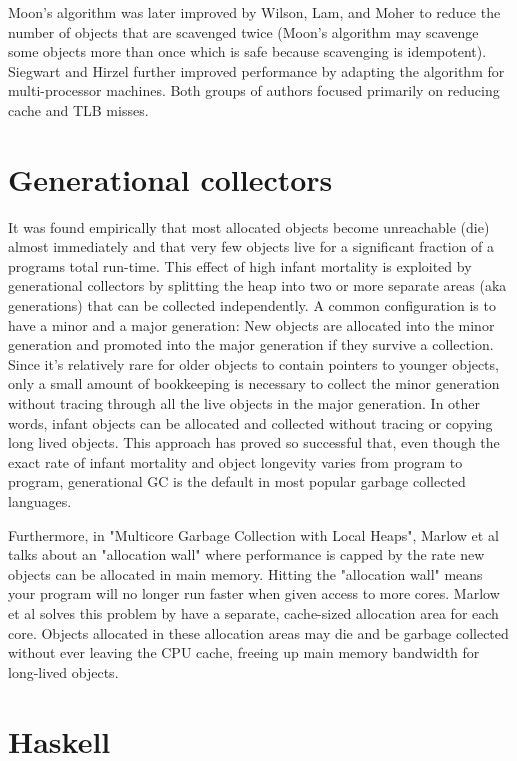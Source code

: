 \documentclass[a4paper,oneside]{memoir}
\begin{document}
Moon's algorithm was later improved by Wilson, Lam, and Moher to reduce the
number of objects that are scavenged twice (Moon's algorithm may scavenge
some objects more than once which is safe because scavenging is idempotent).
\cite{Lam:1992}
Siegwart and Hirzel further improved performance by adapting the algorithm for
multi-processor machines.\cite{Siegwart:2006} Both groups of authors focused primarily on reducing
cache and TLB misses.

\section{Generational collectors}

It was found empirically that most allocated objects become unreachable (die)
almost immediately and that very few objects live for a significant fraction
of a programs total run-time.\cite{Courts:1988,Appel:1989} This effect of high infant mortality is exploited
by generational collectors by splitting the heap into two or more separate areas
(aka generations) that can be collected independently. A common configuration is
to have a minor and a major generation: New objects are allocated into the minor
generation and promoted into the major generation if they survive a collection.
Since it's relatively rare for older objects to contain pointers to younger
objects, only a small amount of bookkeeping is necessary to collect the minor
generation without tracing through all the live objects in the major generation.\cite{Appel:1989}
In other words, infant objects can be allocated and collected without tracing or
copying long lived objects. This approach has proved so successful that, even
though the exact rate of infant mortality and object longevity varies from
program to program, generational GC is the default in most popular garbage
collected languages.

Furthermore, in "Multicore Garbage Collection with Local Heaps", Marlow et al talks
about an "allocation wall" where performance is capped by the rate new objects
can be allocated in main memory.\cite{Marlow:2011} Hitting the "allocation wall" means your
program will no longer run faster when given access to more cores. Marlow et al
solves this problem by have a separate, cache-sized allocation area for each core.
Objects allocated in these allocation areas may die and be garbage collected
without ever leaving the CPU cache, freeing up main memory bandwidth for
long-lived objects.

\section{Haskell}
\end{document}
